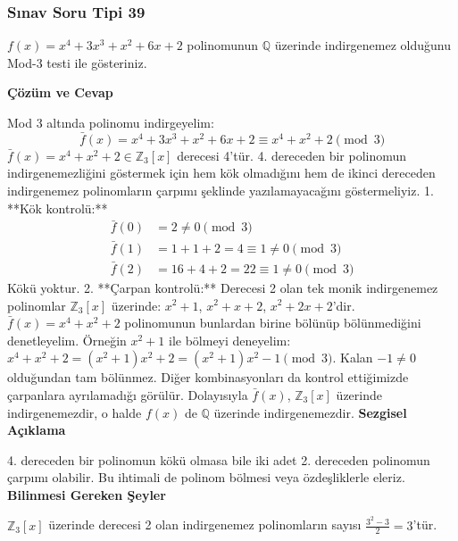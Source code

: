 \documentclass[11pt, a4paper]{article}
\newenvironment{cozum}{
    \vspace{0.5cm}
    \noindent\textcolor{green!60!black}{\faCheckCircle\enspace \textbf{\Large Çözüm ve Cevap}}\par\vspace{0.2cm}
}{}
\newenvironment{sezgisel}{
    \vspace{0.5cm}
    \noindent\textcolor{orange!80!black}{\faLightbulb\enspace \textbf{\Large Sezgisel Açıklama}}\par\vspace{0.2cm}
    \itshape
}{}
\newenvironment{bilgi}{
    \vspace{0.5cm}
    \noindent\textcolor{red!70!black}{\faExclamationTriangle\enspace \textbf{\Large Bilinmesi Gereken Şeyler}}\par\vspace{0.2cm}
}{}
\begin{document}
\subsubsection{Sınav Soru Tipi 39}
\begin{sinavbox}
$f(x) = x^4+3x^3+x^2+6x+2$ polinomunun $\mathbb{Q}$ üzerinde indirgenemez olduğunu Mod-3 testi ile gösteriniz.
\end{sinavbox}
\begin{cozum}
Mod 3 altında polinomu indirgeyelim:
\[ \bar{f}(x) = x^4 + 3x^3 + x^2 + 6x + 2 \equiv x^4 + x^2 + 2 \pmod 3 \]
$\bar{f}(x) = x^4+x^2+2 \in \mathbb{Z}_3[x]$ derecesi 4'tür. 4. dereceden bir polinomun indirgenemezliğini göstermek için hem kök olmadığını hem de ikinci dereceden indirgenemez polinomların çarpımı şeklinde yazılamayacağını göstermeliyiz.
1. **Kök kontrolü:**
\begin{align*}
\bar{f}(0) &= 2 \neq 0 \pmod 3 \\
\bar{f}(1) &= 1+1+2 = 4 \equiv 1 \neq 0 \pmod 3 \\
\bar{f}(2) &= 16+4+2 = 22 \equiv 1 \neq 0 \pmod 3
\end{align*}
Kökü yoktur.
2. **Çarpan kontrolü:**
Derecesi 2 olan tek monik indirgenemez polinomlar $\mathbb{Z}_3[x]$ üzerinde: $x^2+1$, $x^2+x+2$, $x^2+2x+2$'dir.
$\bar{f}(x) = x^4+x^2+2$ polinomunun bunlardan birine bölünüp bölünmediğini denetleyelim.
Örneğin $x^2+1$ ile bölmeyi deneyelim:
$x^4+x^2+2 = (x^2+1)x^2 + 2 = (x^2+1)x^2 - 1 \pmod 3$. Kalan $-1 \neq 0$ olduğundan tam bölünmez.
Diğer kombinasyonları da kontrol ettiğimizde çarpanlara ayrılamadığı görülür.
Dolayısıyla $\bar{f}(x)$, $\mathbb{Z}_3[x]$ üzerinde indirgenemezdir, o halde $f(x)$ de $\mathbb{Q}$ üzerinde indirgenemezdir.
\end{cozum}
\begin{sezgisel}
4. dereceden bir polinomun kökü olmasa bile iki adet 2. dereceden polinomun çarpımı olabilir. Bu ihtimali de polinom bölmesi veya özdeşliklerle eleriz.
\end{sezgisel}
\begin{bilgi}
$\mathbb{Z}_3[x]$ üzerinde derecesi 2 olan indirgenemez polinomların sayısı $\frac{3^2-3}{2} = 3$'tür.
\end{bilgi}

\newpage
\end{document}

